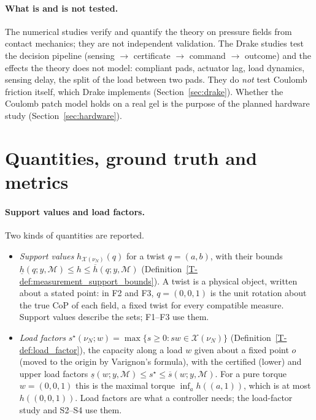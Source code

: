 \documentclass[11pt,a4paper]{article}
\newcommand{\M}{\mathcal M}
\newcommand{\X}{\mathcal X}
\newcommand{\T}[1]{\ref{T-#1}}                       %
\begin{document}
\paragraph{What is and is not tested.} The numerical studies verify and quantify the theory on pressure fields from contact mechanics; they
are not independent validation. The Drake studies test the decision pipeline (sensing $\to$ certificate $\to$ command $\to$ outcome) and the
effects the theory does not model: compliant pads, actuator lag, load dynamics, sensing delay, the split of the load between two pads. They do
\emph{not} test Coulomb friction itself, which Drake implements (Section~\ref{sec:drake}). Whether the Coulomb patch model holds on a real gel is
the purpose of the planned hardware study (Section~\ref{sec:hardware}).

\section{Quantities, ground truth and metrics}
\label{sec:metrics}

\paragraph{Support values and load factors.} Two kinds of quantities are reported.
\begin{itemize}
    \item \emph{Support values} $h_{\X(\nu_N)}(q)$ for a twist $q=(a,b)$, with their bounds $\underline h(q;y,\M)\le h\le\overline h(q;y,\M)$
    (Definition~\T{def:measurement_support_bounds}). A twist is a physical object, written about a stated point: in F2 and F3, $q=(0,0,1)$ is the
    unit rotation about the true CoP of each field, a fixed twist for every compatible measure. Support values describe the sets; F1--F3 use them.
    \item \emph{Load factors} $s^\star(\nu_N;w)=\max\{s\ge0:sw\in\X(\nu_N)\}$ (Definition~\T{def:load_factor}), the capacity along a load $w$
    given about a fixed point $o$ (moved to the origin by Varignon's formula), with the certified (lower) and upper load factors $\underline s(w;y,\M)\le s^\star\le\overline s(w;y,\M)$.
    For a pure torque $w=(0,0,1)$ this is the maximal torque $\inf_a h((a,1))$, which is at most $h((0,0,1))$. Load factors are what a controller
    needs; the load-factor study and S2--S4 use them.
\end{itemize}
\end{document}
